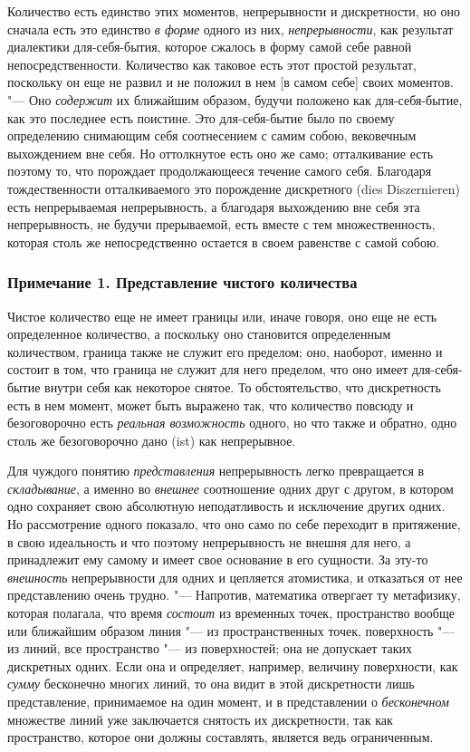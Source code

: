 Количество есть единство этих моментов, непрерывности и дискретности, но оно
сначала есть это единство {\em в форме} одного из них,
{\em непрерывности}, как результат диалектики
для-себя-бытия, которое сжалось в форму самой себе равной
непосредственности. Количество как таковое есть этот простой результат,
поскольку он еще не развил и не положил в нем [в самом себе] своих
моментов. "--- Оно {\em содержит} их ближайшим образом,
будучи положено как для-себя-бытие, как это последнее есть поистине. Это
для-себя-бытие было по своему определению снимающим себя соотнесением с
самим собою, вековечным выхождением вне себя. Но оттолкнутое есть оно же
само; отталкивание есть поэтому то, что порождает продолжающееся течение
самого себя. Благодаря тождественности отталкиваемого это порождение
дискретного (dies Diszernieren) есть непрерываемая непрерывность, а
благодаря выхождению вне себя эта непрерывность, не будучи прерываемой,
есть вместе с тем множественность, которая столь же непосредственно
остается в своем равенстве с самой собою.

\subsubsection[Примечание 1. Представление чистого количества]
{Примечание 1. Представление чистого количества}

Чистое количество еще не имеет границы или, иначе говоря, оно еще не есть
определенное количество, а поскольку оно становится определенным
количеством, граница также не служит его пределом; оно, наоборот, именно и
состоит в том, что граница не служит для него пределом, что оно имеет
для-себя-бытие внутри себя как некоторое снятое. То обстоятельство, что
дискретность есть в нем момент, может быть выражено так, что количество
повсюду и безоговорочно есть {\em реальная возможность} одного, но
что также и обратно, одно столь же безоговорочно дано (ist) как непрерывное.

Для чуждого понятию {\em представления} непрерывность
легко превращается в {\em складывание}, а именно во
{\em внешнее} соотношение одних друг с другом, в
котором одно сохраняет свою абсолютную неподатливость и исключение других
одних. Но рассмотрение одного показало, что оно само по себе переходит в
притяжение, в свою идеальность и что поэтому непрерывность не внешня для
него, а принадлежит ему самому и имеет свое основание в его сущности. За
эту-то {\em внешность} непрерывности для одних и
цепляется атомистика, и отказаться от нее представлению очень трудно. "---
Напротив, математика отвергает ту метафизику, которая полагала, что время
{\em состоит} из временных точек, пространство вообще
или ближайшим образом линия "--- из пространственных точек, поверхность "--- из
линий, все пространство "--- из поверхностей; она не допускает таких
дискретных одних. Если она и определяет, например, величину поверхности,
как {\em сумму} бесконечно многих линий, то она видит в
этой дискретности лишь представление, принимаемое на один момент, и в
представлении о {\em бесконечном} множестве линий уже
заключается снятость их дискретности, так как пространство, которое они
должны составлять, является ведь ограниченным.

